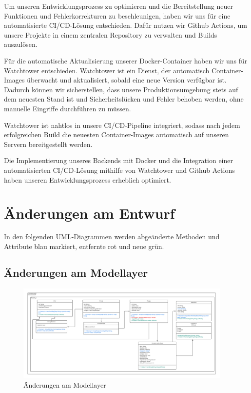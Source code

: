 \documentclass{implementierungsheft}
\begin{document}
Um unseren Entwicklungsprozess zu optimieren und die Bereitstellung neuer Funktionen und Fehlerkorrekturen zu beschleunigen, haben wir uns für eine automatisierte CI/CD-Lösung entschieden. Dafür nutzen wir Github Actions, um unsere Projekte in einem zentralen Repository zu verwalten und Builds auszulösen.

Für die automatische Aktualisierung unserer Docker-Container haben wir uns für Watchtower entschieden. Watchtower ist ein Dienst, der automatisch Container-Images überwacht und aktualisiert, sobald eine neue Version verfügbar ist. Dadurch können wir sicherstellen, dass unsere Produktionsumgebung stets auf dem neuesten Stand ist und Sicherheitslücken und Fehler behoben werden, ohne manuelle Eingriffe durchführen zu müssen.

Watchtower ist nahtlos in unsere CI/CD-Pipeline integriert, sodass nach jedem erfolgreichen Build die neuesten Container-Images automatisch auf unseren Servern bereitgestellt werden.

Die Implementierung unseres Backends mit Docker und die Integration einer automatisierten CI/CD-Lösung mithilfe von Watchtower und Github Actions haben unseren Entwicklungsprozess erheblich optimiert.


\newpage
\section{Änderungen am Entwurf} \label{sec:changes}
In den folgenden UML-Diagrammen werden abgeänderte Methoden und Attribute blau markiert, entfernte rot und neue grün.
\subsection{Änderungen am Modellayer}
\begin{figure}[htp]
    \centering
    \includegraphics[width=0.95\textwidth]{images/uml/modellayer.pdf}
    \caption{Änderungen am Modellayer}
    \label{fig:modellayer}
\end{figure}
\end{document}
